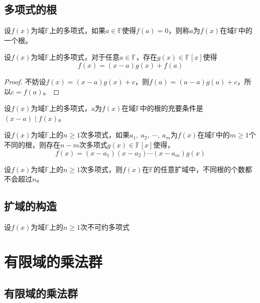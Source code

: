 \documentclass[cn,10pt]{elegantbook}
\begin{document}
\subsection{多项式的根}
\begin{definition}
  设$f(x)$为域$\mathbb{F}$上的多项式，如果$a \in \mathbb{F}$使得$f(a)=0$，则称$a$为$f(x)$在域$\mathbb{F}$中的一个根。
\end{definition}
\begin{theorem}[余元定理]
  设$f(x)$为域$\mathbb{F}$上的多项式，对于任意$a \in \mathbb{F}$，存在$g(x)\in \mathbb{F}[x]$使得
  \begin{equation*}
    f(x)=(x-a)g(x)+f(a)
  \end{equation*}
\end{theorem}
\begin{proof}
  不妨设$f(x)=(x-a)g(x)+c$，则$f(a)=(a-a)g(a)+c$，所以$c = f(a)$。
\end{proof}
\vskip 0.5cm
\begin{conclusion}
  设$f(x)$为域$\mathbb{F}$上的多项式，a为$f(x)$在域$\mathbb{F}$中的根的充要条件是$(x-a)\mid f(x)$。
\end{conclusion}
\vskip 0.5cm
\begin{conclusion}
  设$f(x)$为域$\mathbb{F}$上的$n \geq 1$次多项式，如果$a_1,\ a_2,\ \cdots ,\ a_m$为$f(x)$在域$\mathbb{F}$中的$m \geq 1 $个不同的根，则存在$n-m$次多项式$g(x) \in \mathbb{F}[x]$使得，
  \begin{equation*}
    f(x) = (x-a_1)(x-a_2)\cdots(x-a_m)g(x)
  \end{equation*}
\end{conclusion}
\vskip 0.5cm
\begin{conclusion}
  设$f(x)$为域$\mathbb{F}$上的$n \geq 1$次多项式，则$f(x)$在$\mathbb{F}$的任意扩域中，不同根的个数都不会超过$n$。
\end{conclusion}
\subsection{扩域的构造}
\begin{theorem}
  设$f(x)$为域$\mathbb{F}$上的$n \geq 1$次不可约多项式
\end{theorem}
\section{有限域的乘法群}
\subsection{有限域的乘法群}
\end{document}
